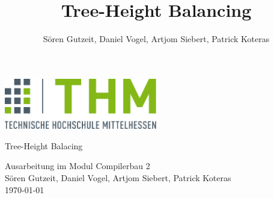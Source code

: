 \documentclass[12pt,a4paper,titlepage,oneside]{scrreprt}
\author{Sören Gutzeit, Daniel Vogel, Artjom Siebert, Patrick Koteras}
\title{Tree-Height Balancing}
\renewcommand{\baselinestretch}{1.50}\normalsize
\begin{document}
\begin{titlepage}
	\begin{center}
		\includegraphics[width=0.5\textwidth]{images/logo.png}\\
		\vspace{3cm}
		\begin{Huge}
			 Tree-Height Balacing
		\end{Huge} \linebreak
		Ausarbeitung im Modul Compilerbau 2 \\
		\vspace{3cm}
		Sören Gutzeit, Daniel Vogel, Artjom Siebert, Patrick Koteras \\
		\today
	\end{center}
\end{titlepage}

\newpage 
\thispagestyle{empty}
\quad
\newpage

\renewcommand{\baselinestretch}{1.30}\normalsize
{}
\setcounter{page}{1}
\tableofcontents
\renewcommand{\baselinestretch}{1.50}\normalsize

\setcounter{last_roman}{\value{page}}
\newpage






\newpage 
\thispagestyle{empty}
\quad
\newpage

\setcounter{page}{\value{last_roman}}

\newpage

\newpage

\newpage

\end{document}
